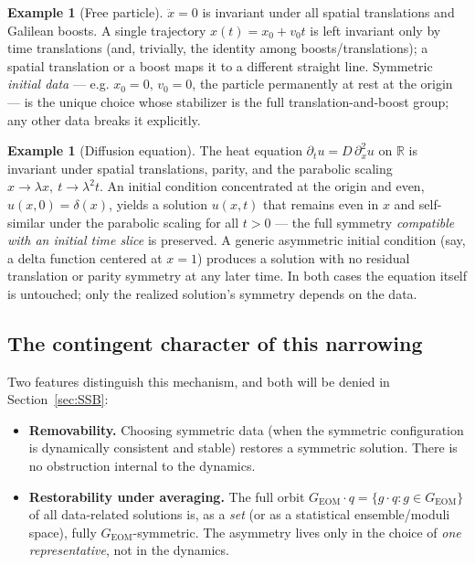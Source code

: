 \documentclass[11pt]{article}
\theoremstyle{definition}
\newtheorem{example}[theorem]{Example}
\theoremstyle{remark}
\newcommand{\Real}{\mathbb{R}}
\newcommand{\GEOM}{G_{\mathrm{EOM}}}
\begin{document}
\begin{example}[Free particle]
$\ddot x=0$ is invariant under all spatial translations and Galilean boosts. A single trajectory $x(t)=x_0+v_0t$ is left invariant only by time translations (and, trivially, the identity among boosts/translations); a spatial translation or a boost maps it to a different straight line. Symmetric \emph{initial data} — e.g. $x_0=0,\,v_0=0$, the particle permanently at rest at the origin — is the unique choice whose stabilizer is the full translation-and-boost group; any other data breaks it explicitly.
\end{example}

\begin{example}[Diffusion equation]
The heat equation $\partial_t u = D\,\partial_x^2 u$ on $\Real$ is invariant under spatial translations, parity, and the parabolic scaling $x\to\lambda x,\ t\to\lambda^2 t$. An initial condition concentrated at the origin and even, $u(x,0)=\delta(x)$, yields a solution $u(x,t)$ that remains even in $x$ and self-similar under the parabolic scaling for all $t>0$ — the full symmetry \emph{compatible with an initial time slice} is preserved. A generic asymmetric initial condition (say, a delta function centered at $x=1$) produces a solution with no residual translation or parity symmetry at any later time. In both cases the equation itself is untouched; only the realized solution's symmetry depends on the data.
\end{example}

\subsection{The contingent character of this narrowing}

Two features distinguish this mechanism, and both will be denied in Section~\ref{sec:SSB}:
\begin{itemize}
\item \textbf{Removability.} Choosing symmetric data (when the symmetric configuration is dynamically consistent and stable) restores a symmetric solution. There is no obstruction internal to the dynamics.
\item \textbf{Restorability under averaging.} The full orbit $\GEOM \cdot q = \{g\cdot q: g\in\GEOM\}$ of all data-related solutions is, as a \emph{set} (or as a statistical ensemble/moduli space), fully $\GEOM$-symmetric. The asymmetry lives only in the choice of \emph{one representative}, not in the dynamics.
\end{itemize}
\end{document}
